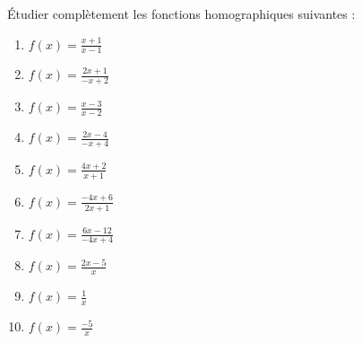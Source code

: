\begin{exercice}
Étudier complètement les fonctions homographiques suivantes :
\begin{multicols}{2}
\begin{enumerate}
\item $f(x)=\frac{x+1}{x-1}$
\item $f(x)=\frac{2x+1}{-x+2}$
\item $f(x)=\frac{x-3}{x-2}$
\item $f(x)=\frac{2x-4}{-x+4}$
\item $f(x)=\frac{4x+2}{x+1}$
\item $f(x)=\frac{-4x+6}{2x+1}$
\item $f(x)=\frac{6x-12}{-4x+4}$
\item $f(x)=\frac{2x-5}{x}$
\item $f(x)=\frac{1}{x}$
\item $f(x)=\frac{-5}{x}$
\end{enumerate}
\end{multicols}
\end{exercice}